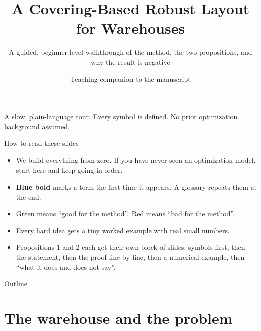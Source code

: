 \documentclass[11pt,aspectratio=169]{beamer}
\title[CSLAP Robust Covering, explained]{A Covering-Based Robust Layout for Warehouses}
\subtitle{A guided, beginner-level walkthrough of the method, the two propositions, and why the result is negative}
\author{Teaching companion to the manuscript}
\institute{CSLAP robustness study}
\date{}
\newcommand{\term}[1]{\textcolor{blue!60!black}{\textbf{#1}}}
\begin{document}
\begin{frame}[plain]
  \titlepage
  \begin{center}\small A slow, plain-language tour. Every symbol is defined. No prior optimization background assumed.\end{center}
\end{frame}

\begin{frame}{How to read these slides}
  \begin{itemize}
    \item We build everything from zero. If you have never seen an optimization model, start here and keep going in order.
    \item \term{Blue bold} marks a term the first time it appears. A glossary repeats them at the end.
    \item Green means ``good for the method''. Red means ``bad for the method''.
    \item Every hard idea gets a tiny worked example with real small numbers.
    \item Propositions 1 and 2 each get their own block of slides: symbols first, then the statement, then the proof line by line, then a numerical example, then ``what it does and does not say''.
  \end{itemize}
\end{frame}

\begin{frame}{Outline}
  \tableofcontents
\end{frame}


\section{The warehouse and the problem}
\end{document}

